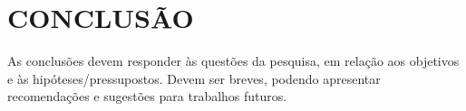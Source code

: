 \chapter{CONCLUSÃO}

As conclusões devem responder às questões da pesquisa, em relação aos objetivos e às hipóteses/pressupostos. Devem ser breves, podendo apresentar recomendações e sugestões para trabalhos futuros.
